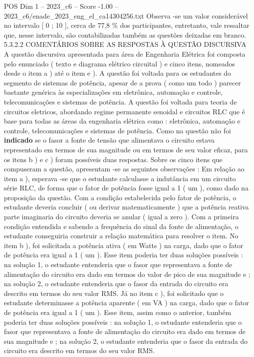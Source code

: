 \begin{textsample}{POS Dim 1 – 2023\_c6 – Score -1.00 – 2023\_c6/enade\_2023\_eng\_el\_ca14304256.txt}
Observa -se um valor considerável no intervalo [ 0 ; 10 ], cerca de 77,8 \% dos participantes, entretanto, vale ressaltar que, nesse intervalo, são contabilizadas também as questões deixadas em branco. 5.3.2.2 COMENTÁRIOS SOBRE AS RESPOSTAS À QUESTÃO DISCURSIVA A questão discursiva apresentada para área de Engenharia Elétrica foi composta pelo enunciado ( texto e diagrama elétrico circuital ) e cinco itens, nomeados desde o item a ) até o item e ).
A questão foi voltada para os estudantes do segmento de sistemas de potência, apesar de a prova ( como um todo ) parecer bastante genérica às especializações em eletrônica, automação e controle, telecomunicações e sistemas de potência.
A questão foi voltada para teoria de circuitos eletricos, abordando regime permanente senoidal e circuitos RLC que é base para todas as áreas da engenharia elétrica como : eletrônica, automação e controle, telecomunicações e sistemas de potência.
Como na questão não foi \textbf{indicado} se o fasor a fonte de tensão que alimentava o circuito estava representado em termos de sua magnitude ou em termos de seu valor eficaz, para os itens b ) e c ) foram possíveis duas respostas.
Sobre os cinco itens que compuseram a questão, apresentam -se as seguintes observações : Em relação ao item a ), esperava -se que o estudante calculasse a indutância em um circuito série RLC, de forma que o fator de potência fosse igual a 1 ( um ), como dado na proposição da questão.
Com a condição estabelecida pelo fator de potência, o estudante deveria concluir ( ou derivar matematicamente ) que a potência reativa parte imaginaria do circuito deveria se anular ( igual a zero ).
Com a primeira condição entendida e sabendo a frequência do sinal da fonte de alimentação, o estudante conseguiria construir a relação matemática para resolver o item.
No item b ), foi solicitada a potência ativa ( em Watts ) na carga, dado que o fator de potência era igual a 1 ( um ).
Esse item poderia ter duas soluções possíveis : na solução 1, o estudante entenderia que o fasor que representava a fonte de alimentação do circuito era dado em termos do valor de pico de sua magnitude e ; na solução 2, o estudante entenderia que o fasor da entrada do circuito era descrito em termos do seu valor RMS.
Já no item c ), foi solicitado que o estudante determinasse a potência aparente ( em VA ) na carga, dado que o fator de potência era igual a 1 ( um ).
Esse item, assim como o anterior, também poderia ter duas soluções possíveis : na solução 1, o estudante entenderia que o fasor que representava a fonte de alimentação do circuito era dado em termos de sua magnitude e ; na solução 2, o estudante entenderia que o fasor da entrada do circuito era descrito em termos do seu valor RMS.

\end{textsample}
